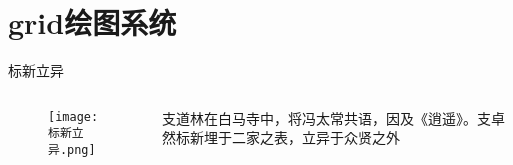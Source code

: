 

\section{grid绘图系统}
\begin{frame}{标新立异}{}
  \begin{columns}
    \begin{column}{.5\textwidth}
      \begin{figure}
        \centering \texttt{[image: 标新立异.png]}
      \end{figure}
    \end{column}

    \begin{column}{.5\textwidth}
      \begin{ornamentblock}
        {支道林在白马寺中，将冯太常共语，因及《逍遥》。支卓然标新埋于二家之表，立异于众贤之外\\
          }
      \end{ornamentblock}
    \end{column}
  \end{columns}
\end{frame}

